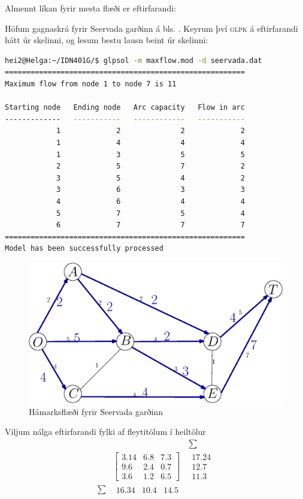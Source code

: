 \begin{lausnSYND}Almennt líkan fyrir mesta flæði er eftirfarandi:
 
Höfum gagnaskrá fyrir Seervada garðinn á bls. \pageref{seervada.dat}. 
Keyrum því \textsc{glpk} á eftirfarandi hátt úr skelinni, og lesum bestu lausn beint úr skelinni:
\begin{lstlisting}[language=bash]
hei2@Helga:~/IDN401G/$ glpsol -m maxflow.mod -d seervada.dat
========================================================
Maximum flow from node 1 to node 7 is 11

Starting node   Ending node   Arc capacity   Flow in arc
-------------   -----------   ------------   -----------
            1             2              2             2
            1             4              4             4
            1             3              5             5
            2             5              7             2
            3             5              4             2
            3             6              3             3
            4             6              4             4
            5             7              5             4
            6             7              7             7
========================================================
Model has been successfully processed
\end{lstlisting}
\begin{figure}[h!]
 \begin{center}
  \includegraphics[width=0.7\columnwidth]{figs/seervada_maxflow.eps}
 \end{center}\caption{Hámarksflæði fyrir Seervada garðinn}
\end{figure}
\end{lausnSYND}
\newpage
\begin{daemi}Viljum nálga eftirfarandi fylki af fleytitölum í heiltölur
\[\begin{array}{ccc}
& & \sum \\
&\begin{bmatrix}
   3.14 & 6.8 & 7.3 \\
   9.6 & 2.4 & 0.7 \\
   3.6 & 1.2 & 6.5 
 \end{bmatrix} & \begin{matrix} 17.24 \\ 12.7 \\ 11.3\end{matrix} \\ 
\sum & \begin{matrix} 16.34 & 10.4 & 14.5\end{matrix}
\end{array}\]
\end{daemi}
